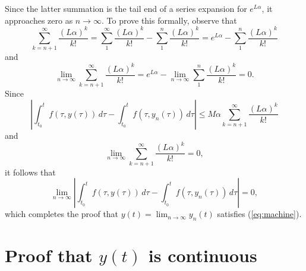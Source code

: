 \documentclass{myart}
\newcommand{\eq}[1]{(\ref{eq:#1})}
\begin{document}
Since the latter summation is the tail end of a series expansion for
$e^{L\alpha}$, it approaches zero as $n \to \infty$. To prove this
formally, observe that
\begin{equation*}
  \sum_{k=n+1}^\infty \frac{(L\alpha)^k}{k!}
= \sum_1^\infty
    \frac{(L\alpha)^k}{k!} - \sum_1^n \frac{(L\alpha)^k}{k!}
= e^{L\alpha} - \sum_1^n \frac{(L\alpha)^k}{k!}
\end{equation*}
and
\begin{equation*}
  \lim_{n \to \infty} \sum_{k=n+1}^\infty \frac{(L\alpha)^k}{k!}
= e^{L\alpha} - \lim_{n \to \infty} \sum_1^n
                                      \frac{(L\alpha)^k}{k!} = 0.
\end{equation*}
Since
\begin{equation*}
     \left|  \int_{t_0}^t f(\tau, y(\tau)) \,d\tau
           - \int_{t_0}^t f(\tau, y_n(\tau)) \,d\tau
     \right|
\leq M\alpha \sum_{k=n+1}^\infty \frac{(L\alpha)^k}{k!}
\end{equation*}
and
\begin{equation*}
\lim_{n \to \infty} \sum_{k=n+1}^\infty \frac{(L\alpha)^k}{k!} = 0,
\end{equation*}
it follows that
\begin{equation*}
\lim_{n \to \infty}
  \left|  \int_{t_0}^t f(\tau, y(\tau)) \,d\tau
        - \int_{t_0}^t f(\tau, y_n(\tau)) \,d\tau\right| = 0,
\end{equation*}
which completes the proof that $y(t) = \lim_{n \to \infty} y_n(t)$
satisfies \eq{machine}.

\section{Proof that \texorpdfstring{$y(t)$}{y(t)} is continuous}
\end{document}
